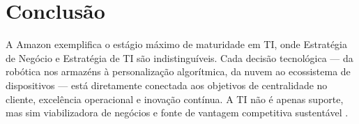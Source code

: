 \documentclass[12pt,a4paper,oneside]{article}
\begin{document}
\section{Conclusão}

A Amazon exemplifica o estágio máximo de maturidade em TI, onde Estratégia de Negócio e Estratégia de TI são indistinguíveis. Cada decisão tecnológica --- da robótica nos armazéns à personalização algorítmica, da nuvem ao ecossistema de dispositivos --- está diretamente conectada aos objetivos de centralidade no cliente, excelência operacional e inovação contínua. A TI não é apenas suporte, mas sim viabilizadora de negócios e fonte de vantagem competitiva sustentável \cite{rocha2018}.



\end{document}
